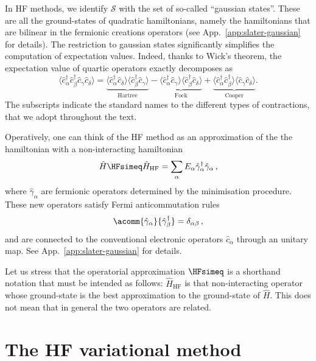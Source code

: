 In HF methods, we identify $\mathcal{S}$ with the set of so-called ``gaussian states''. These are all the ground-states of quadratic hamiltonians, namely the hamiltonians that are bilinear in the fermionic creations operators (see App.~\ref{app:slater-gaussian} for details). The restriction to gaussian states significantly simplifies the computation of expectation values. Indeed, thanks to Wick's theorem, the expectation value of quartic operators exactly decomposes as
\begin{equation}\label{eq:hf-wick-hfc}
	\langle
	\hat c_\alpha^\dagger \hat c_\beta^\dagger \hat c_\gamma \hat c_\delta
	\rangle = \underbrace{
		\langle 
		\hat c_\alpha^\dagger \hat c_\delta
		\rangle \langle	
		\hat c_\beta^\dagger \hat c_\gamma 
		\rangle
	}_{\text{Hartree}}
	- 
	\underbrace{
		\langle 
		\hat c_\alpha^\dagger \hat c_\gamma
		\rangle \langle	
		\hat c_\beta^\dagger \hat c_\delta 
		\rangle 
	}_{\text{Fock}}
	+ 
	\underbrace{
		\langle 
		\hat c_\alpha^\dagger \hat c_\beta^\dagger
		\rangle \langle	
		\hat c_\gamma \hat c_\delta 
		\rangle 
	}_{\text{Cooper}}.
\end{equation}
The subscripts indicate the standard names to the different types of contractions, that we adopt throughout the text.

Operatively, one can think of the HF method as an approximation of the the hamiltonian with a non-interacting hamiltonian
\[
	\hat H \HFsimeq	\hat H_\mathrm{HF} = \sum_{\alpha} E_\alpha \hat\gamma_\alpha^\dagger \hat\gamma_\alpha \, ,
\]
where $\hat \gamma_\alpha$ are fermionic operators determined by the minimisation procedure. These new operators satisfy Fermi anticommutation rules
\[
	\acomm{\hat\gamma_\alpha}{\hat\gamma_\beta^\dagger} = \delta_{\alpha\beta} \, ,
\]
and are connected to the conventional electronic operators $\hat c_\alpha$ through an unitary map. See App.~\ref{app:slater-gaussian} for details.

Let us stress that the operatorial approximation $\HFsimeq$ is a shorthand notation that must be intended as follows: $\hat H_\mathrm{HF}$ is that non-interacting operator whose ground-state is the best approximation to the ground-state of $\hat H$. This does not mean that in general the two operators are related.

\section{The HF variational method}\label{sec:sketch-hf-method}


